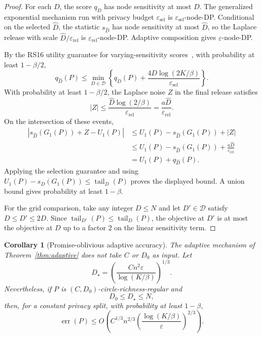 \documentclass[11pt]{article}
\newtheorem{corollary}[theorem]{Corollary}
\newcommand{\eps}{\varepsilon}
\newcommand{\calD}{\mathcal{D}}
\newcommand{\tail}{\operatorname{tail}}
\begin{document}
\begin{proof}
For each \(D\), the score \(q_D\) has node sensitivity at most \(D\). The generalized exponential mechanism run with privacy budget \(\eps_{\mathrm{sel}}\) is \(\eps_{\mathrm{sel}}\)-node-DP. Conditional on the selected \(\widehat D\), the statistic \(s_{\widehat D}\) has node sensitivity at most \(\widehat D\), so the Laplace release with scale \(\widehat D/\eps_{\mathrm{rel}}\) is \(\eps_{\mathrm{rel}}\)-node-DP. Adaptive composition gives \(\eps\)-node-DP.

By the RS16 utility guarantee for varying-sensitivity scores~\cite[Theorem~1.4]{RS16}, with probability at least \(1-\beta/2\),
\[
q_{\widehat D}(P)\le
\min_{D\in\calD}
\left\{q_D(P)+\frac{4D\log(2K/\beta)}{\eps_{\mathrm{sel}}}\right\}.
\]
With probability at least \(1-\beta/2\), the Laplace noise \(Z\) in the final release satisfies
\[
|Z|\le \frac{\widehat D\log(2/\beta)}{\eps_{\mathrm{rel}}}=\frac{a\widehat D}{\eps_{\mathrm{rel}}}.
\]
On the intersection of these events,
\begin{align*}
|s_{\widehat D}(G_1(P))+Z-U_1(P)|
&\le U_1(P)-s_{\widehat D}(G_1(P))+|Z|\\
&\le U_1(P)-s_{\widehat D}(G_1(P))+\frac{a\widehat D}{\eps_{\mathrm{rel}}}\\
&=U_1(P)+q_{\widehat D}(P).
\end{align*}
Applying the selection guarantee and using \(U_1(P)-s_D(G_1(P))\le \tail_D(P)\) proves the displayed bound. A union bound gives probability at least \(1-\beta\).

For the grid comparison, take any integer \(D\le N\) and let \(D'\in\calD\) satisfy \(D\le D'\le 2D\). Since \(\tail_{D'}(P)\le \tail_D(P)\), the objective at \(D'\) is at most the objective at \(D\) up to a factor \(2\) on the linear sensitivity term.
\end{proof}

\begin{corollary}[Promise-oblivious adaptive accuracy]
\label{cor:promise-oblivious}
The adaptive mechanism of Theorem~\ref{thm:adaptive} does not take \(C\) or \(D_0\) as input. Let
\[
D_\star=\left(\frac{C n^2\eps}{\log(K/\beta)}\right)^{1/3}.
\]
Nevertheless, if \(P\) is \((C,D_0)\)-circle-richness-regular and
\[
D_0\le D_\star\le N,
\]
then, for a constant privacy split, with probability at least \(1-\beta\),
\[
\operatorname{err}(P)\le
O\!\left(C^{1/3}n^{2/3}\left(\frac{\log(K/\beta)}{\eps}\right)^{2/3}\right).
\]
\end{corollary}
\end{document}
